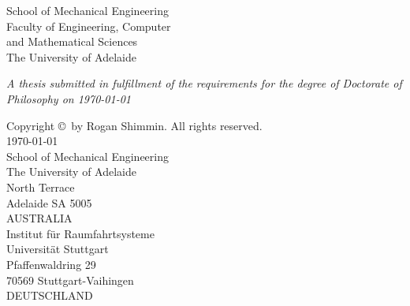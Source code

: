 \begin{titlepage}
  \vfill

  \small{
  School of Mechanical Engineering\\
  Faculty of Engineering, Computer\\ and Mathematical Sciences\\
  The University of Adelaide
  }

  \vfill

  \center
  \emph{A thesis submitted in fulfillment of the requirements for the degree of Doctorate of Philosophy on \mydate\today}

\end{titlepage}

\newpage\thispagestyle{empty}
{\setlength\parindent{0pt}

Copyright \copyright\the\year\ by Rogan Shimmin. All rights reserved.\\[2cm]

\today\\[2cm]

School of Mechanical Engineering\\
The University of Adelaide\\
North Terrace \\
Adelaide SA 5005\\
AUSTRALIA\\[2cm]

Institut f\"{u}r Raumfahrtsysteme\\
Universit\"{a}t Stuttgart\\
Pfaffenwaldring 29\\
70569 Stuttgart-Vaihingen\\
DEUTSCHLAND
}

